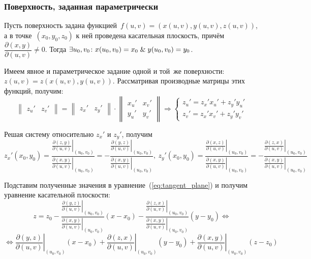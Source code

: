 \subsubsection{Поверхность, заданная параметрически}
Пусть поверхность задана функцией~$f(u, v) = (x(u, v), y(u, v), z(u, v))$, а в точке~$(x_0, y_0, z_0)$ к ней проведена касательная плоскость, причём $\dfrac{\partial(x, y)}{\partial(u, v)} \neq 0$.
Тогда $\exists u_0, v_0 \colon x(u_0, v_0) = x_0 \mathrel{\&} y(u_0, v_0) = y_0$.

Имеем явное и параметрическое задание одной и той~же поверхности: $z(u, v) = z(x(u, v), y(u, v))$.
Рассматривая производные матрицы этих функций, получим:
\begin{equation*}
\begin{Vmatrix}
z_u' & z_v'
\end{Vmatrix} =
\begin{Vmatrix}
z_x' & z_y'
\end{Vmatrix} \cdot
\begin{Vmatrix}
x_u' & x_v' \\
y_u' & y_v'
\end{Vmatrix} \Rightarrow
\begin{cases}
z_u' = z_x' x_u' + z_y' y_u' \\
z_v' = z_x' x_v' + z_y' y_v'
\end{cases}
\end{equation*}

Решая систему относительно $z_x'$ и $z_y'$, получим
\begin{equation*}
z_x'(x_0, y_0) = \frac
{\left. \frac{\partial(z, y)}{\partial(u, v)} \right|_{(u_0, v_0)}}
{\left. \frac{\partial(x, y)}{\partial(u, v)} \right|_{(u_0, v_0)}} =
-\frac
{\left. \frac{\partial(y, z)}{\partial(u, v)} \right|_{(u_0, v_0)}}
{\left. \frac{\partial(x, y)}{\partial(u, v)} \right|_{(u_0, v_0)}}, \
z_y'(x_0, y_0) = \frac
{\left. \frac{\partial(x, z)}{\partial(u, v)} \right|_{(u_0, v_0)}}
{\left. \frac{\partial(x, y)}{\partial(u, v)} \right|_{(u_0, v_0)}} =
-\frac
{\left. \frac{\partial(z, x)}{\partial(u, v)} \right|_{(u_0, v_0)}}
{\left. \frac{\partial(x, y)}{\partial(u, v)} \right|_{(u_0, v_0)}}
\end{equation*}

Подставим полученные значения в уравнение~(\ref*{eq:tangent_plane}) и получим уравнение касательной плоскости:
\begin{equation*}
z = z_0 - \frac
{\left. \frac{\partial(y, z)}{\partial(u, v)} \right|_{(u_0, v_0)}}
{\left. \frac{\partial(x, y)}{\partial(u, v)} \right|_{(u_0, v_0)}} (x - x_0) -
\frac
{\left. \frac{\partial(z, x)}{\partial(u, v)} \right|_{(u_0, v_0)}}
{\left. \frac{\partial(x, y)}{\partial(u, v)} \right|_{(u_0, v_0)}} (y - y_0)  \Leftrightarrow
\end{equation*}
\begin{equation*}
\Leftrightarrow \left. \frac{\partial(y, z)}{\partial(u, v)} \right|_{(u_0, v_0)} (x - x_0) +
\left. \frac{\partial(z, x)}{\partial(u, v)} \right|_{(u_0, v_0)} (y - y_0) +
\left. \frac{\partial(x, y)}{\partial(u, v)} \right|_{(u_0, v_0)} (z - z_0)
\end{equation*}